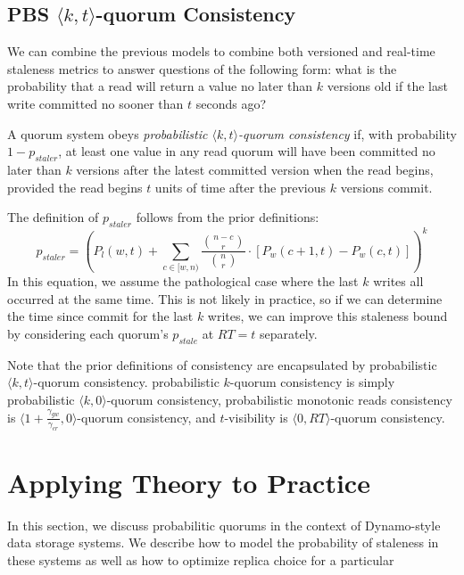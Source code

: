 \documentclass{vldb}
\begin{document}
\subsection{PBS $\langle k, t
  \rangle$-quorum Consistency}

We can combine the previous models to combine both versioned and
real-time staleness metrics to answer questions of the following form:
what is the probability that a read will return a value no later than
$k$ versions old if the last write committed no sooner than $t$ seconds
ago?
\begin{definition}
A quorum system obeys \textit{probabilistic $\langle k, t
  \rangle$-quorum consistency} if, with probability $1-p_{staler}$, at
least one value in any read quorum will have been committed no later
than $k$ versions after the latest committed version when the read
begins, provided the read begins $t$ units of time after the previous
$k$ versions commit.
\end{definition}
The definition of $p_{staler}$ follows from the prior definitions:
\begin{equation}
p_{staler} = (P_l(w, t)+\sum_{c\in[w, n)} \frac{{n-c \choose r}}{{n \choose r}} \cdot [P_w(c+1, t)-P_w(c,t)])^k
\end{equation}
In this equation, we assume the pathological case where the last $k$
writes all occurred at the same time.  This is not likely in practice,
so if we can determine the time since commit for the last $k$ writes,
we can improve this staleness bound by considering each quorum's $p_{stale}$ at $RT=t$ separately.

Note that the prior definitions of consistency are encapsulated by
probabilistic $\langle k, t \rangle$-quorum consistency. probabilistic
$k$-quorum consistency is simply probabilistic $\langle k, 0
\rangle$-quorum consistency, probabilistic monotonic reads consistency
is $\langle 1+\frac{\gamma_{gw}}{\gamma_{cr}}, 0 \rangle$-quorum
consistency, and $t$-visibility is $\langle 0, RT \rangle$-quorum
consistency.

\section{Applying Theory to Practice}
\label{sec:optimize}

In this section, we discuss probabilitic quorums in the context of
Dynamo-style data storage systems.  We describe how to model the
probability of staleness in these systems as well as how to optimize
replica choice for a particular
\end{document}
